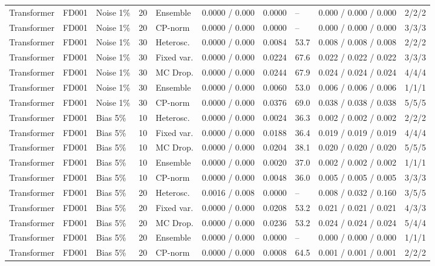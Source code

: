 \documentclass[10pt,a4paper]{article}
\begin{document}
\begin{landscape}
\begin{center}
\begin{longtable}{lllllcclll}
Transformer & FD001 & Noise 1\% & 20 & Ensemble & 0.0000 / 0.000 & 0.0000 & -- & 0.000 / 0.000 / 0.000 & 2/2/2 \\
Transformer & FD001 & Noise 1\% & 20 & CP-norm & 0.0000 / 0.000 & 0.0000 & -- & 0.000 / 0.000 / 0.000 & 3/3/3 \\
Transformer & FD001 & Noise 1\% & 30 & Heterosc. & 0.0000 / 0.000 & 0.0084 & 53.7 & 0.008 / 0.008 / 0.008 & 2/2/2 \\
Transformer & FD001 & Noise 1\% & 30 & Fixed var. & 0.0000 / 0.000 & 0.0224 & 67.6 & 0.022 / 0.022 / 0.022 & 3/3/3 \\
Transformer & FD001 & Noise 1\% & 30 & MC Drop. & 0.0000 / 0.000 & 0.0244 & 67.9 & 0.024 / 0.024 / 0.024 & 4/4/4 \\
Transformer & FD001 & Noise 1\% & 30 & Ensemble & 0.0000 / 0.000 & 0.0060 & 53.0 & 0.006 / 0.006 / 0.006 & 1/1/1 \\
Transformer & FD001 & Noise 1\% & 30 & CP-norm & 0.0000 / 0.000 & 0.0376 & 69.0 & 0.038 / 0.038 / 0.038 & 5/5/5 \\
Transformer & FD001 & Bias 5\% & 10 & Heterosc. & 0.0000 / 0.000 & 0.0024 & 36.3 & 0.002 / 0.002 / 0.002 & 2/2/2 \\
Transformer & FD001 & Bias 5\% & 10 & Fixed var. & 0.0000 / 0.000 & 0.0188 & 36.4 & 0.019 / 0.019 / 0.019 & 4/4/4 \\
Transformer & FD001 & Bias 5\% & 10 & MC Drop. & 0.0000 / 0.000 & 0.0204 & 38.1 & 0.020 / 0.020 / 0.020 & 5/5/5 \\
Transformer & FD001 & Bias 5\% & 10 & Ensemble & 0.0000 / 0.000 & 0.0020 & 37.0 & 0.002 / 0.002 / 0.002 & 1/1/1 \\
Transformer & FD001 & Bias 5\% & 10 & CP-norm & 0.0000 / 0.000 & 0.0048 & 36.0 & 0.005 / 0.005 / 0.005 & 3/3/3 \\
Transformer & FD001 & Bias 5\% & 20 & Heterosc. & 0.0016 / 0.008 & 0.0000 & -- & 0.008 / 0.032 / 0.160 & 3/5/5 \\
Transformer & FD001 & Bias 5\% & 20 & Fixed var. & 0.0000 / 0.000 & 0.0208 & 53.2 & 0.021 / 0.021 / 0.021 & 4/3/3 \\
Transformer & FD001 & Bias 5\% & 20 & MC Drop. & 0.0000 / 0.000 & 0.0236 & 53.2 & 0.024 / 0.024 / 0.024 & 5/4/4 \\
Transformer & FD001 & Bias 5\% & 20 & Ensemble & 0.0000 / 0.000 & 0.0000 & -- & 0.000 / 0.000 / 0.000 & 1/1/1 \\
Transformer & FD001 & Bias 5\% & 20 & CP-norm & 0.0000 / 0.000 & 0.0008 & 64.5 & 0.001 / 0.001 / 0.001 & 2/2/2 \\

\end{longtable}
\end{center}
\end{landscape}
\end{document}
